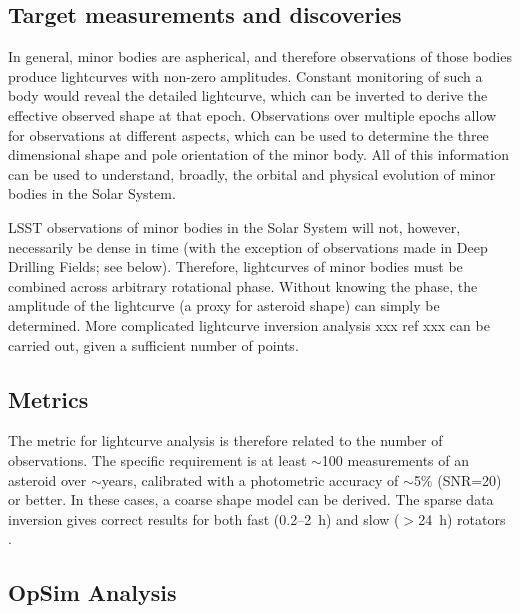 \subsection{Target measurements and discoveries}
\label{sec:\secname:targets}

In general, minor bodies are aspherical,
and therefore observations of those bodies
produce lightcurves with non-zero amplitudes.
Constant monitoring of such a body would
reveal the detailed lightcurve, which can
be inverted to derive the effective observed
shape at that epoch.
Observations
over multiple epochs allow for observations
at different aspects, which can be used to
determine the three dimensional shape and pole
orientation of the minor body. All of this
information can be used to understand,
broadly, the orbital and physical evolution
of minor bodies in the Solar System.

LSST observations of minor bodies in the Solar System
will not, however, necessarily be dense in time
(with the exception of observations made in
Deep Drilling Fields; see below).
Therefore, lightcurves of minor bodies must
be combined across arbitrary rotational phase.
Without knowing the phase, the amplitude of
the lightcurve (a proxy for
asteroid shape) can simply be determined.
More complicated lightcurve inversion analysis
xxx ref xxx
can be carried out, given a sufficient number
of points.



\subsection{Metrics}
\label{sec:\secname:metrics}

The metric for lightcurve analysis
is therefore related to the number
of observations. The specific requirement
is
at least $\sim$100 measurements of an asteroid over
$\sim$years,
calibrated with a photometric accuracy of
$\sim$5\% (SNR=20)
or better. In these cases,
a coarse shape model can be derived.
The sparse data inversion gives correct results for both fast (0.2--2~h) and
slow ($>$24~h) rotators \citep{2007IAUS..236..191D}.




\subsection{OpSim Analysis}
\label{sec:\secname:analysis}

